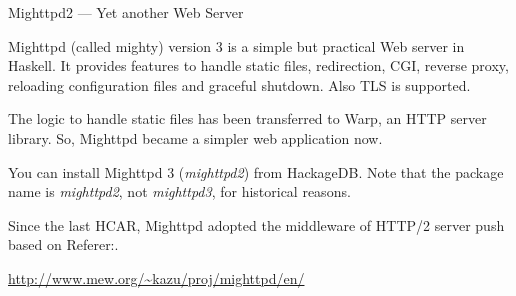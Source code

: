 \begin{hcarentry}[updated]{Mighttpd2 --- Yet another Web Server}
\label{mighttpd2}
\makeheader

Mighttpd (called mighty) version 3 is a simple but practical Web server in Haskell.
It provides features to handle static files, redirection, CGI, reverse proxy, reloading
configuration files and graceful shutdown. Also TLS is supported.

The logic to handle static files has been transferred to Warp, an HTTP server library. So, Mighttpd became a simpler web application now.

You can install Mighttpd 3 ({\it mighttpd2}) from HackageDB. Note that the package name
is {\it mighttpd2}, not {\it mighttpd3}, for historical reasons.

Since the last HCAR, Mighttpd adopted the middleware of
HTTP/2 server push based on Referer:.

\FurtherReading
\begin{compactitem}
\item \url{http://www.mew.org/~kazu/proj/mighttpd/en/}
\end{compactitem}
\end{hcarentry}
